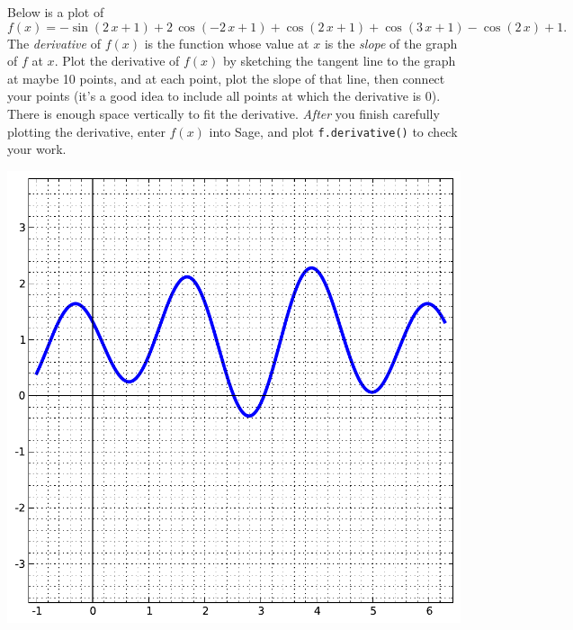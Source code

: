 Below is a plot of $$f(x)=-\sin\left(2 \, x + 1\right) + 2 \, \cos\left(-2 \, x + 1\right) + \cos\left(2 \, x + 1\right) + \cos\left(3 \, x + 1\right) - \cos\left(2 \, x\right) + 1.$$  The {\em \color{red}derivative} of $f(x)$ is the function whose value at $x$ is the {\em slope} of the graph of $f$ at $x$.  Plot the derivative of $f(x)$ by sketching the tangent line to the graph at maybe 10 points, and at each point, plot the slope of that line, then connect your points (it's a good idea to include all points at which the derivative is 0).  There is enough space vertically to fit the derivative.  {\em After} you finish carefully plotting the derivative, enter $f(x)$ into Sage, and plot {\color{blue}\verb|f.derivative()|} to check your work.
\begin{center}\includegraphics{functions/43.pdf}\end{center}\newpage

